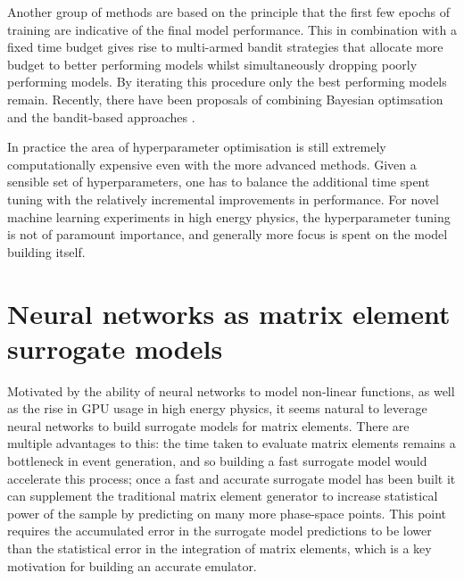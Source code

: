 \documentclass[main.tex]{subfiles}
\begin{document}
    Another group of methods are based on the principle
    that the first few epochs of training are indicative
    of the final model performance. This in combination
    with a fixed time budget gives rise to multi-armed
    bandit strategies \cite{jamieson2016non,li2017hyperband}
    that allocate more budget to better
    performing models whilst simultaneously dropping poorly
    performing models. By iterating this procedure only the 
    best performing models remain. Recently, there have
    been proposals of combining Bayesian optimsation and
    the bandit-based approaches \cite{falkner2018bohb}.
    
    In practice the area of hyperparameter optimisation
    is still extremely computationally expensive even with
    the more advanced methods. Given a sensible set of hyperparameters,
    one has to balance the additional time spent tuning with the
    relatively incremental improvements in performance. For
    novel machine learning experiments in high energy physics,
    the hyperparameter tuning is not of paramount importance,
    and generally more focus is spent on the model building itself.

\section{Neural networks as matrix element surrogate models}\label{sec:NN_ME}
    Motivated by the ability of neural networks to
    model non-linear functions, as well as the rise
    in GPU usage in high energy physics, it seems
    natural to leverage neural networks to build surrogate
    models for matrix elements. There are multiple advantages
    to this: the time taken to evaluate matrix elements remains
    a bottleneck in event generation, and so building a
    fast surrogate model would accelerate this process;
    once a fast and accurate surrogate model has been
    built it can supplement the traditional matrix
    element generator to increase statistical power of the sample
    by predicting on many more phase-space points. This point
    requires the accumulated error in the surrogate model
    predictions to be lower than the statistical error in the
    integration of matrix elements, which is a key motivation
    for building an accurate emulator.
\end{document}
